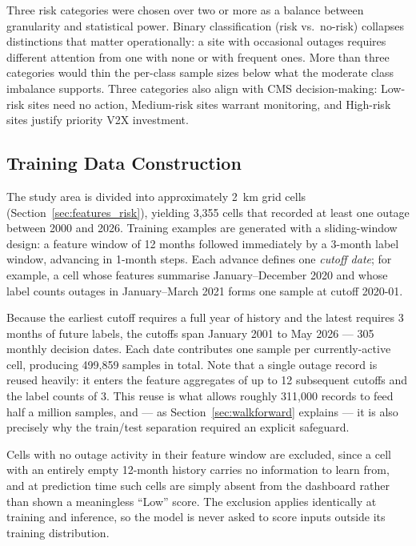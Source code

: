 Three risk categories were chosen over two or more as a balance between granularity and statistical power. Binary classification (risk vs.\ no-risk) collapses distinctions that matter operationally: a site with occasional outages requires different attention from one with none or with frequent ones. More than three categories would thin the per-class sample sizes below what the moderate class imbalance supports. Three categories also align with CMS decision-making: Low-risk sites need no action, Medium-risk sites warrant monitoring, and High-risk sites justify priority V2X investment.

\subsection{Training Data Construction}

The study area is divided into approximately 2~km grid cells (Section~\ref{sec:features_risk}), yielding 3{,}355 cells that recorded at least one outage between 2000 and 2026. Training examples are generated with a sliding-window design: a feature window of 12 months followed immediately by a 3-month label window, advancing in 1-month steps. Each advance defines one \emph{cutoff date}; for example, a cell whose features summarise January--December 2020 and whose label counts outages in January--March 2021 forms one sample at cutoff 2020-01.

Because the earliest cutoff requires a full year of history and the latest requires 3 months of future labels, the cutoffs span January 2001 to May 2026 --- 305 monthly decision dates. Each date contributes one sample per currently-active cell, producing 499,859 samples in total. Note that a single outage record is reused heavily: it enters the feature aggregates of up to 12 subsequent cutoffs and the label counts of 3. This reuse is what allows roughly 311{,}000 records to feed half a million samples, and --- as Section~\ref{sec:walkforward} explains --- it is also precisely why the train/test separation required an explicit safeguard.

Cells with no outage activity in their feature window are excluded, since a cell with an entirely empty 12-month history carries no information to learn from, and at prediction time such cells are simply absent from the dashboard rather than shown a meaningless ``Low'' score. The exclusion applies identically at training and inference, so the model is never asked to score inputs outside its training distribution.


